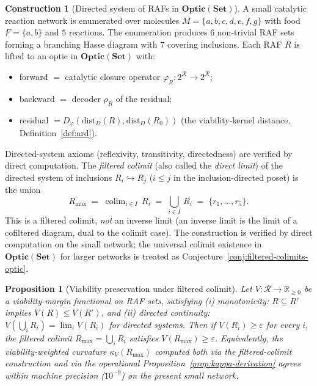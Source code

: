 \documentclass[11pt,a4paper]{article}
\theoremstyle{plain}
\newtheorem{proposition}[theorem]{Proposition}
\theoremstyle{definition}
\newtheorem{construction}[theorem]{Construction}
\theoremstyle{remark}
\newcommand{\kk}{\kappa_{\!V}}
\newcommand{\RR}{\mathbb{R}}
\newcommand{\Optic}{\mathbf{Optic}}
\newcommand{\colim}{\operatorname{colim}}
\begin{document}
\begin{construction}[Directed system of RAFs in $\Optic(\mathbf{Set})$]
\label{con:invlim}
A small catalytic reaction network is enumerated over molecules
$M = \{a,b,c,d,e,f,g\}$ with food $F = \{a,b\}$ and $5$ reactions. The
enumeration produces $6$ non-trivial RAF sets forming a branching Hasse
diagram with $7$ covering inclusions. Each RAF $R$ is lifted to an
optic in $\Optic(\mathbf{Set})$ with:
\begin{itemize}[leftmargin=1.2em,itemsep=1pt]
\item forward $=$ catalytic closure operator $\varphi_R:
2^{\mathcal{R}}\to 2^{\mathcal{R}}$;
\item backward $=$ decoder $\rho_R$ of the residual;
\item residual $= D_\varphi(\mathrm{dist}_D(R), \mathrm{dist}_D(R_0))$
(the viability-kernel distance, Definition~\ref{def:ard}).
\end{itemize}
Directed-system axioms (reflexivity, transitivity, directedness) are
verified by direct computation. The \emph{filtered colimit} (also
called the \emph{direct limit}) of the directed system of inclusions
$R_i \hookrightarrow R_j$ ($i \leq j$ in the inclusion-directed
poset) is the union
\begin{equation}\label{eq:rmax-colim}
  R_{\max} \;=\; \colim_{i\in I}\, R_i \;=\; \bigcup_{i\in I}\, R_i
  \;=\; \{r_1, \ldots, r_5\}.
\end{equation}
This is a filtered colimit, \emph{not} an inverse limit (an inverse
limit is the limit of a cofiltered diagram, dual to the colimit case).
The construction is verified by direct computation on the small
network; the universal colimit existence in $\Optic(\mathbf{Set})$ for
larger networks is treated as
Conjecture~\ref{conj:filtered-colimits-optic}.
\end{construction}

\begin{proposition}[Viability preservation under filtered colimit]
\label{prop:invlim}
Let $V : \mathcal R \to \RR_{\geq 0}$ be a viability-margin functional
on RAF sets, satisfying (i) \emph{monotonicity}: $R \subseteq R'$
implies $V(R) \leq V(R')$, and (ii) \emph{directed continuity}:
$V(\bigcup_i R_i) = \lim_i V(R_i)$ for directed systems. Then if
$V(R_i) \geq \varepsilon$ for every $i$, the filtered colimit
$R_{\max} = \bigcup_i R_i$ satisfies $V(R_{\max}) \geq \varepsilon$.
Equivalently, the viability-weighted curvature $\kk(R_{\max})$
computed both via the filtered-colimit construction and via the
operational Proposition~\ref{prop:kappa-derivation} agrees within
machine precision ($10^{-9}$) on the present small network.
\end{proposition}
\end{document}
